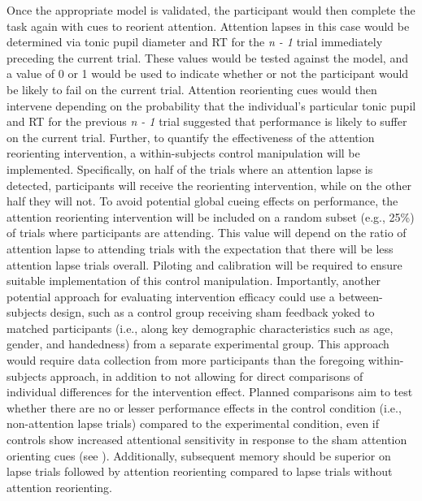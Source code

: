 Once the appropriate model is validated, the participant would then complete the task again with cues to reorient attention. Attention lapses in this case would be determined via tonic pupil diameter and RT for the \emph{n - 1} trial immediately preceding the current trial. These values would be tested against the model, and a value of 0 or 1 would be used to indicate whether or not the participant would be likely to fail on the current trial. Attention reorienting cues would then intervene depending on the probability that the individual's particular tonic pupil and RT for the previous \emph{n - 1} trial suggested that performance is likely to suffer on the current trial. Further, to quantify the effectiveness of the attention reorienting intervention, a within-subjects control manipulation will be implemented. Specifically, on half of the trials where an attention lapse is detected, participants will receive the reorienting intervention, while on the other half they will not. To avoid potential global cueing effects on performance, the attention reorienting intervention will be included on a random subset (e.g., 25\%) of trials where participants are attending. This value will depend on the ratio of attention lapse to attending trials with the expectation that there will be less attention lapse trials overall. Piloting and calibration will be required to ensure suitable implementation of this control manipulation. Importantly, another potential approach for evaluating intervention efficacy could use a between-subjects design, such as a control group receiving sham feedback yoked to matched participants (i.e., along key demographic characteristics such as age, gender, and handedness) from a separate experimental group. This approach would require data collection from more participants than the foregoing within-subjects approach, in addition to not allowing for direct comparisons of individual differences for the intervention effect. Planned comparisons aim to test whether there are no or lesser performance effects in the control condition (i.e., non-attention lapse trials) compared to the experimental condition, even if controls show increased attentional sensitivity in response to the sham attention orienting cues (see \cite{megan2015closed}). Additionally, subsequent memory should be superior on lapse trials followed by attention reorienting compared to lapse trials without attention reorienting.


